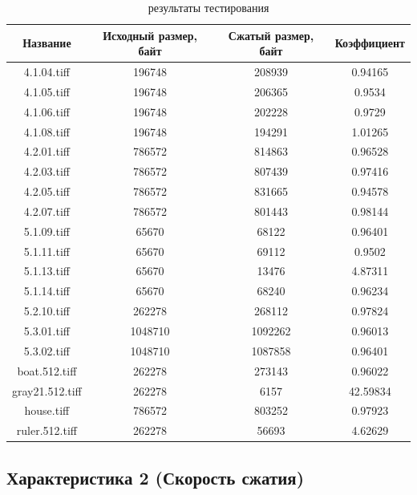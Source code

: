 \documentclass[a4paper,oneside]{article}
\theoremstyle{definition}
\begin{document}
\begin{table}[H]
  \small
  \centering
  \begin{tabular}{|c|c|c|c|}
    \hline
    Название     & Исходный размер, байт & Сжатый размер, байт & Коэффициент \\ \hline \hline
    4.1.04.tiff     &  196748 &  208939 & 0.94165  \\ \hline
    4.1.05.tiff     &  196748 &  206365 & 0.9534   \\ \hline
    4.1.06.tiff     &  196748 &  202228 & 0.9729   \\ \hline
    4.1.08.tiff     &  196748 &  194291 & 1.01265  \\ \hline
    4.2.01.tiff     &  786572 &  814863 & 0.96528  \\ \hline
    4.2.03.tiff     &  786572 &  807439 & 0.97416  \\ \hline
    4.2.05.tiff     &  786572 &  831665 & 0.94578  \\ \hline
    4.2.07.tiff     &  786572 &  801443 & 0.98144  \\ \hline
    5.1.09.tiff     &   65670 &   68122 & 0.96401  \\ \hline
    5.1.11.tiff     &   65670 &   69112 & 0.9502   \\ \hline
    5.1.13.tiff     &   65670 &   13476 & 4.87311  \\ \hline
    5.1.14.tiff     &   65670 &   68240 & 0.96234  \\ \hline
    5.2.10.tiff     &  262278 &  268112 & 0.97824  \\ \hline
    5.3.01.tiff     & 1048710 & 1092262 & 0.96013  \\ \hline
    5.3.02.tiff     & 1048710 & 1087858 & 0.96401  \\ \hline
    boat.512.tiff   &  262278 &  273143 & 0.96022  \\ \hline
    gray21.512.tiff &  262278 &    6157 & 42.59834 \\ \hline
    house.tiff      &  786572 &  803252 & 0.97923  \\ \hline
    ruler.512.tiff  &  262278 &   56693 & 4.62629  \\ \hline
  \end{tabular}
  \caption{результаты тестирования}
  \label{tbl:results}
\end{table}

\subsection{Характеристика 2 (Скорость сжатия)}
\end{document}
